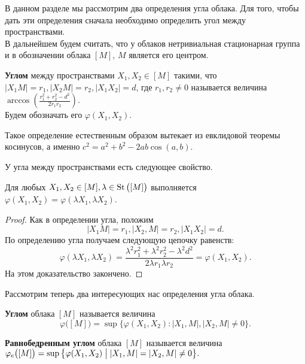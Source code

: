 В данном разделе мы рассмотрим два определения угла облака. Для того,
чтобы дать эти определения сначала необходимо определить угол между
пространствами.
\\
В дальнейшем будем считать, что у облаков нетривиальная стационарная группа
и в обозначении облака $ [M] $, $ M $ является его центром.
\begin{defin}
  \textbf{Углом} между пространствами $ X_1,
  X_2 \in [M] $ такими, что $ |X_1 M| = r_1, | X_2 M | =r_2, |X_1
  X_2| = d$, где $ r_1,
  r_2 \neq 0 $ называется величина $ \arccos \left(\frac{r_1^2 +
  r_{2}^2 - d^2}{2r_1r_2} \right)$.\\ Будем обозначать его $
  \varphi(X_1, X_2) $.
\end{defin}
\begin{remark}
  Такое определение естественным образом вытекает из евклидовой теоремы
  косинусов, а именно $ c^{2} = a^2 + b^2 - 2ab\cos (a,b) $.
\end{remark}
У угла между пространствами есть следующее свойство.
\begin{lemma}
  \label{lemmaAngleBetweenSpaces}
  Для любых \( X_1, X_2 \in [M], \lambda \in \operatorname{St}\big([M]\big) \) выполняется
  \( \varphi (X_1, X_2) = \varphi (\lambda X_1, \lambda X_2) \).
\end{lemma}
\begin{proof}
  Как в определении угла, положим \[ |X_1 M| = r_1, | X_2, M
  | =r_2, |X_1 X_2| = d.\]
  По определению угла получаем следующую цепочку равенств:
  \[ \varphi (\lambda X_1, \lambda X_2) = \frac{\lambda ^{2} r_1^2 +
    \lambda ^2 r_2^2 - \lambda^2 d^2}{2 \lambda  r_1 \lambda r_2} =
    \varphi (X_1, X_2).
  \]
  На этом доказательство закончено.
\end{proof}
Рассмотрим теперь два интересующих нас определения угла облака.
\begin{defin}
  \textbf{Углом} облака $ [M] $ называется величина
  \[
    \varphi \big([M]\big)= \sup \big\{\varphi (X_1, X_2) \colon | X_1,M
    |, |X_2,M| \neq 0\big\}.
  \]
\end{defin}
\begin{defin}
  \textbf{Равнобедренным углом} облака $ [M] $ называется величина
  \(
    \varphi_e \big([M]\big) = \sup \big\{\varphi (X_1, X_2) \bigm|
    |X_1,M | = |X_2,M| \neq 0\big\}.
  \)
\end{defin}
